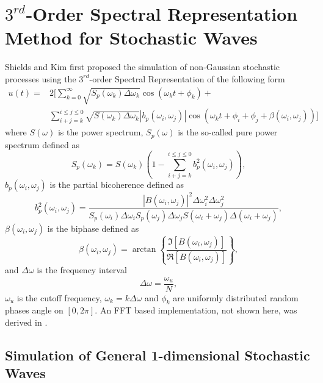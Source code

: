 \documentclass[preprint, review, 12pt]{elsarticle}
\begin{document}
\section{$3^{rd}$-Order Spectral Representation Method for Stochastic Waves}

Shields and Kim \cite{Shields2017} first proposed the simulation of non-Gaussian stochastic processes using the $3^{rd}$-order Spectral Representation of the following form
\begin{equation}
\begin{aligned}
    u(t) = & 2 \Bigg[ \sum_{k=0}^{\infty} \sqrt{S_p(\omega_k)\Delta\omega_k} \cos(\omega_k t + \phi_k) + \\
    & \sum_{i + j = k}^{i \leq j \leq 0} \sqrt{S(\omega_k)\Delta\omega_k} |b_{p}(\omega_i, \omega_j)| \cos(\omega_k t + \phi_i + \phi_j + \beta(\omega_i, \omega_j)) \Bigg]
\end{aligned}
\end{equation}
where $S(\omega)$ is the power spectrum, $S_p(\omega)$ is the so-called pure power spectrum defined as
\begin{equation}
    S_p(\omega_k) = S(\omega_k)(1 - \sum_{i + j = k}^{i \leq j \leq 0} b_p^2(\omega_i, \omega_j)),
    \end{equation}
$b_p(\omega_i, \omega_j)$ is the partial bicoherence defined as
\begin{equation}
    b_p^2(\omega_i, \omega_j) = \frac{|B(\omega_i, \omega_j)|^2 \Delta \omega_i^2 \Delta \omega_j^2}{S_p(\omega_i)\Delta \omega_i S_p(\omega_j) \Delta \omega_j S(\omega_i + \omega_j) \Delta (\omega_i + \omega_j)},
\end{equation}
$\beta(\omega_i, \omega_j)$ is the biphase defined as
\begin{equation}
    \beta(\omega_i, \omega_j) = \arctan \left\{ \frac{\Im[B(\omega_i, \omega_j)]}{\Re[B(\omega_i, \omega_j)]} \right\},
\end{equation}
and $\Delta \omega$ is the frequency interval
\begin{equation}
    \Delta \omega = \frac{\omega_u}{N},
\end{equation}
$\omega_u$ is the cutoff frequency, $\omega_k = k \Delta \omega$ and $\phi_k$ are uniformly distributed random phases angle on $[0, 2\pi]$. An FFT based implementation, not shown here, was derived in \cite{Vandanapu2021}. 

\subsection{Simulation of General 1-dimensional Stochastic Waves}
\end{document}
